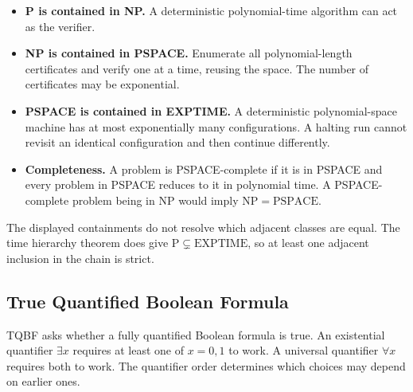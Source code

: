 \documentclass[12pt,a4paper]{article}
\begin{document}
\begin{tcolorbox}[tikzbox, title={Known inclusions between time and space classes}]
\centering
{}\par
\end{tcolorbox}

\begin{itemize}[leftmargin=*, itemsep=3pt, topsep=4pt]
  \item \textbf{P is contained in NP.} A deterministic polynomial-time algorithm can act as the verifier.
  \item \textbf{NP is contained in PSPACE.} Enumerate all polynomial-length certificates and verify one at a time, reusing the space. The number of certificates may be exponential.
  \item \textbf{PSPACE is contained in EXPTIME.} A deterministic polynomial-space machine has at most exponentially many configurations. A halting run cannot revisit an identical configuration and then continue differently.
  \item \textbf{Completeness.} A problem is PSPACE-complete if it is in PSPACE and every problem in PSPACE reduces to it in polynomial time. A PSPACE-complete problem being in NP would imply $\mathrm{NP}=\mathrm{PSPACE}$.
\end{itemize}
The displayed containments do not resolve which adjacent classes are equal. The time hierarchy theorem does give $\mathrm{P}\subsetneq\mathrm{EXPTIME}$, so at least one adjacent inclusion in the chain is strict.

\subsection{True Quantified Boolean Formula}
\begin{tcolorbox}[defbox, title={TQBF}]
TQBF asks whether a fully quantified Boolean formula is true. An existential quantifier $\exists x$ requires at least one of $x=0,1$ to work. A universal quantifier $\forall x$ requires both to work. The quantifier order determines which choices may depend on earlier ones.
\end{tcolorbox}
\end{document}
